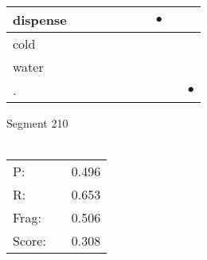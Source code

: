 \documentclass[landscape]{article}
\newcommand{\ssp}{\hspace{2pt}}
\newcommand{\mex}{\cellcolor{g}$\bullet$}
\begin{document}
\begin{tabular}{|l|p{10pt}|p{10pt}|p{10pt}|p{10pt}|p{10pt}|p{10pt}|p{10pt}|p{10pt}|p{10pt}|}
\hline
\ssp \cellcolor{ref6}dispense \ssp&\hspace{2pt}&\hspace{2pt}&\hspace{2pt}&\hspace{2pt}&\hspace{2pt}&\hspace{2pt}&\hspace{2pt}\mex&\hspace{2pt}&\hspace{2pt}\\
\hline
\ssp cold \ssp&\hspace{2pt}&\hspace{2pt}&\hspace{2pt}&\hspace{2pt}&\hspace{2pt}&\hspace{2pt}&\hspace{2pt}&\hspace{2pt}&\hspace{2pt}\\
\hline
\ssp water \ssp&\hspace{2pt}&\hspace{2pt}&\hspace{2pt}&\hspace{2pt}&\hspace{2pt}&\hspace{2pt}&\hspace{2pt}&\hspace{2pt}&\hspace{2pt}\\
\hline
\ssp \cellcolor{ref8}. \ssp&\hspace{2pt}&\hspace{2pt}&\hspace{2pt}&\hspace{2pt}&\hspace{2pt}&\hspace{2pt}&\hspace{2pt}&\hspace{2pt}&\hspace{2pt}\mex\\
\hline
\end{tabular}

\vspace{6pt}
\noindent Segment 210\\\\
\noindent\begin{tabular}{lm{12pt}r}
\hline
P:&&0.496\\
R:&&0.653\\
Frag:&&0.506\\
Score:&&0.308\\
\end{tabular}
\end{document}
